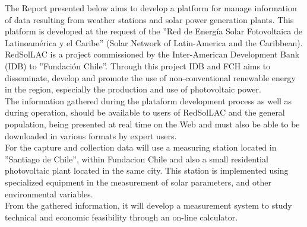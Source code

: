 The Report presented below aims to develop a platform for manage information of data resulting from weather stations and solar power generation plants. This platform is developed at the request of the ''Red de Energía Solar Fotovoltaica de Latinoamérica y el Caribe'' (Solar Network of Latin-America and the Caribbean). RedSolLAC is a project commissioned by the Inter-American Development Bank (IDB) to ''Fundación Chile''. Through this project IDB and FCH aims to disseminate, develop and promote the use of non-conventional renewable energy in the region, especially the production and use of photovoltaic power. \\

The information gathered during the plataform development process as well as during operation, should be available to users of RedSolLAC and the general population, being presented at real time on the Web and must also be able to be downloaded in various formats by expert users. \\

For the capture and collection data will use a measuring station located in ''Santiago de Chile'', within Fundacion Chile and also a small residential photovoltaic plant located in the same city. This station is implemented using specialized equipment in the measurement of solar parameters, and other environmental variables. \\

From the gathered information, it will develop a measurement system to study technical and economic feasibility through an on-line calculator. \\

